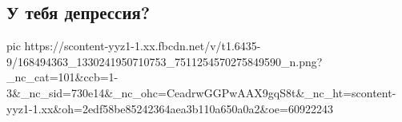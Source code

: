  
 
 
 
 

\subsection{У тебя депрессия?}
\label{sec:05_04_2021.fb.1.depressia}

\ifcmt
  pic https://scontent-yyz1-1.xx.fbcdn.net/v/t1.6435-9/168494363_1330241950710753_7511254570275849590_n.png?_nc_cat=101&ccb=1-3&_nc_sid=730e14&_nc_ohc=CeadrwGGPwAAX9gqS8t&_nc_ht=scontent-yyz1-1.xx&oh=2edf58be85242364aea3b110a650a0a2&oe=60922243
\fi
